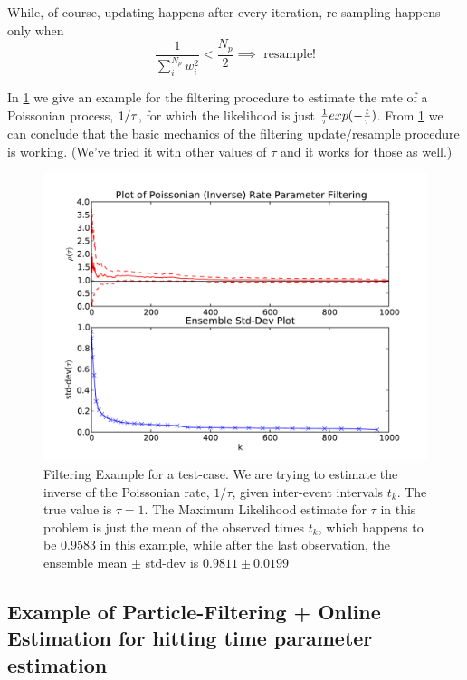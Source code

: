 While, of course, updating happens after every iteration, re-sampling happens
only when  
$$ \frac{1}{\sum_i^{N_p} w_i^2} < \frac {N_p}{2} \implies \textrm{ resample!}$$

In \cref{fig:poissonian_rate_filtering} we give an example for the filtering
procedure to estimate the rate of a Poissonian process, $1/{\tau}$, for which  the
likelihood is just $\tfrac 1{{\tau}} exp(- \tfrac t{{\tau}})$. From
\cref{fig:poissonian_rate_filtering} we can conclude that the basic mechanics of
the filtering update/resample procedure is working. (We've tried it with other
values of $\tau$ and it works for those as well.)

\begin{figure}[htp]
\begin{center}
  \includegraphics[width=\textwidth]{Figs/TauParticleEnsemble/poisson_rate_filtering.pdf}
  \caption{Filtering Example for a test-case. We are trying to estimate the
  inverse of the Poissonian rate, $1/\tau$, given inter-event intervals $t_k$.
  The true value is $\tau  = 1$. The Maximum Likelihood estimate for $\tau$ in
  this problem  is just the mean of the observed times $\bar{t_k}$, which
  happens to be 0.9583 in this example, while after the last observation, the
  ensemble mean $\pm$ std-dev is $0.9811\pm 0.0199$}
  \label{fig:poissonian_rate_filtering}
\end{center}
\end{figure}


\subsection{Example of Particle-Filtering + Online Estimation for hitting time
parameter estimation}

